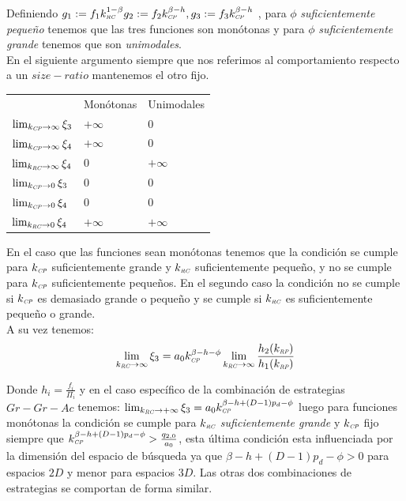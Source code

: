 Definiendo $g_1:= f_1 k_{\textit{\tiny RC}}^{1-\beta} g_2:= f_2 k_{\textit{\tiny CP}}^{\beta- h} , g_3 := f_3 k_{\textit{\tiny CP}}^{\beta-h} $ , para $\phi$ \emph{suficientemente peque\~no} tenemos que las tres funciones son mon\'otonas y para $\phi$ \emph{suficientemente grande} tenemos que son \emph{unimodales}.\\

En el siguiente argumento siempre que nos referimos al comportamiento respecto a un $size-ratio$ mantenemos el otro fijo.\\

\begin{tabular}{p{1.5in}|m{1.5in}|m{1.5in}} 
 & Mon\'otonas  & Unimodales \\
$\lim_{k_{\textit{\tiny CP}} \to \infty} \xi_3$ & $+\infty$  & 0 \\
$\lim_{k_{\textit{\tiny CP}} \to \infty} \xi_4$ & $+\infty$  & 0 \\
$\lim_{k_{\textit{\tiny RC}} \to \infty} \xi_4$ & 0  & $+\infty$ \\
$\lim_{k_{\textit{\tiny CP}} \to 0} \xi_3$ & 0 & 0 \\
$\lim_{k_{\textit{\tiny CP}} \to 0} \xi_4$ & 0 & 0 \\
$\lim_{k_{\textit{\tiny RC}} \to 0} \xi_4$ & $+\infty$ & $+\infty$ \\
\end{tabular}

En el caso que las funciones sean mon\'otonas tenemos que la condici\'on se cumple para $k_{\textit{\tiny CP}}$ suficientemente grande y $k_{\textit{\tiny RC}}$ suficientemente peque\~no, y no se cumple para $k_{\textit{\tiny CP}}$ suficientemente peque\~nos. En el segundo caso la condici\'on no se cumple si $k_{\textit{\tiny CP}}$ es demasiado grande o peque\~no y se cumple si $k_{\textit{\tiny RC}}$ es suficientemente peque\~no o grande.\\

A su vez tenemos:
\begin{equation}
  \lim_{k_{\textit{\tiny RC}} \to \infty} \xi_3 = a_0 k_{\textit{\tiny CP}}^{\beta - h - \phi} \lim_{k_{\textit{\tiny RC}} \to \infty} \frac{h_2(k_{\textit{\tiny RP}})}{h_1(k_{\textit{\tiny RP}})} 
\end{equation}

Donde $h_i = \frac{f_i}{\Pi_i}$ y en el caso espec\'ifico de la combinaci\'on de estrategias $Gr-Gr-Ac$ tenemos: $\lim_{k_{\textit{\tiny RC}} \to +\infty} \xi_3 = a_0 k_{\textit{\tiny CP}}^{\beta -h + (D-1)p_d - \phi}$ luego para funciones mon\'otonas la condici\'on se cumple para $k_{\textit{\tiny RC}}$ \emph{suficientemente grande} y $k_{\textit{\tiny CP}}$ fijo siempre que $k_{\textit{\tiny CP}}^{\beta - h + (D-1)p_d - \phi} > \frac{q_{2,0}}{a_0}$, esta \'ultima condici\'on esta influenciada por la dimensi\'on del espacio de b\'usqueda ya que $ \beta - h + (D-1)p_d - \phi >0$ para espacios $2D$ y menor para espacios $3D$. Las otras dos combinaciones de estrategias se comportan de forma similar.\\

